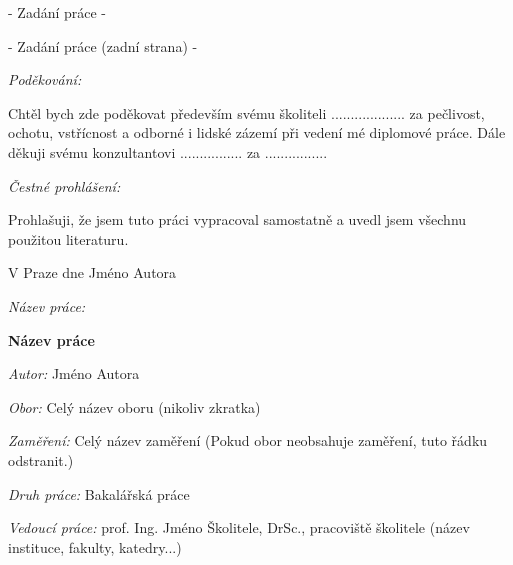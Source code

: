 \documentclass[a4paper,11pt]{book}
\begin{document}
\newpage

\null\newpage

\null\vfill
\begin{center}
	- Zadání práce -
\par\end{center}
\vfill

\newpage

\null\vfill
\begin{center}
	- Zadání práce (zadní strana) -
\par\end{center}
\vfill

\newpage

\noindent \textit{\Large Poděkování:}

\noindent Chtěl bych zde poděkovat především svému školiteli ...................
za pečlivost, ochotu, vstřícnost a odborné i lidské zázemí při vedení
mé diplomové práce. Dále děkuji svému konzultantovi ................
za ................

\vfill

\noindent \textit{\Large Čestné prohlášení:}

\noindent Prohlašuji, že jsem tuto práci vypracoval samostatně a uvedl
jsem všechnu použitou literaturu.

\bigskip

\noindent V Praze dne \documentdate\hfill Jméno Autora

\vspace{2cm}

\newpage

\null\newpage

\begin{onehalfspace}
	\noindent \textit{Název práce:}

	\noindent \textbf{Název práce}
\end{onehalfspace}

\bigskip

\noindent \textit{Autor:} Jméno Autora

\bigskip

\noindent \textit{Obor:} Celý název oboru (nikoliv zkratka)

\bigskip

\noindent \textit{Zaměření:} Celý název zaměření (Pokud obor neobsahuje
zaměření, tuto řádku odstranit.)

\bigskip

\noindent \textit{Druh práce:} Bakalářská práce

\bigskip

\noindent \textit{Vedoucí práce:} prof. Ing. Jméno Školitele, DrSc.,
pracoviště školitele (název instituce, fakulty, katedry...)
\end{document}
